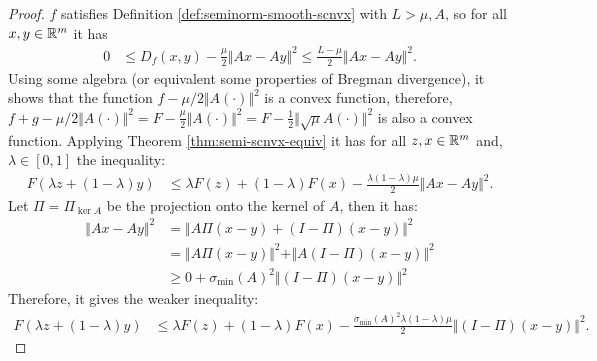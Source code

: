 \documentclass[12pt]{article}
\begin{document}
            \begin{proof}
                $f$ satisfies Definition \ref{def:seminorm-smooth-scnvx} with $L > \mu, A$, so for all $x, y \in \mathbb R^m$ it has 
                \begin{align*}
                    0 &\le D_f(x, y) - \frac{\mu}{2}\Vert Ax - Ay\Vert^2 
                    \le \frac{L - \mu}{2}\Vert Ax - Ay\Vert^2. 
                \end{align*}
                Using some algebra (or equivalent some properties of Bregman divergence), it shows that the function $f - \mu/2 \Vert A(\cdot)\Vert^2$ is a convex function, therefore, $f + g - \mu/2\Vert A(\cdot)\Vert^2 = F - \frac{\mu}{2}\Vert A(\cdot)\Vert^2 = F - \frac{1}{2}\Vert \sqrt{\mu}A(\cdot)\Vert^2$ is also a convex function. 
                Applying Theorem \ref{thm:semi-scnvx-equiv} it has for all $z, x \in \mathbb R^m$ and, $\lambda \in [0, 1]$ the inequality: 
                \begin{align*}
                    F(\lambda z + (1 - \lambda)y) &\le \lambda F(z) + (1 - \lambda)F(x) - \frac{\lambda(1 - \lambda)\mu}{2}\Vert Ax - Ay\Vert^2. 
                \end{align*}
                Let $\Pi = \Pi_{\ker A}$ be the projection onto the kernel of $A$, then it has: 
                \begin{align*}
                    \Vert Ax - Ay\Vert^2 &= \Vert A\Pi(x - y) + (I - \Pi)(x - y) \Vert^2
                    \\
                    &= 
                    \Vert A\Pi(x - y) \Vert^2 + \Vert A(I - \Pi)(x - y) \Vert^2
                    \\
                    &\ge 0 + \sigma_{\min}(A)^2\Vert (I - \Pi)(x - y) \Vert^2
                \end{align*}
                Therefore, it gives the weaker inequality: 
                \begin{align*}
                    F(\lambda z + (1 - \lambda)y) &\le \lambda F(z) + (1 - \lambda)F(x) - \frac{\sigma_{\min}(A)^2\lambda(1 - \lambda)\mu}{2}\Vert (I - \Pi)(x - y)\Vert^2. 
                \end{align*}
            \end{proof}
        
\end{document}
